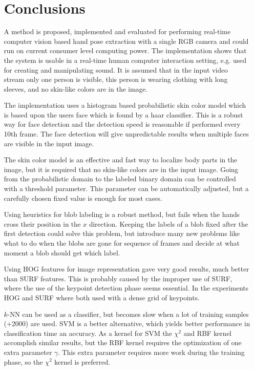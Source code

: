
\chapter{Conclusions}
\label{ch:conc}
A method is proposed, implemented and evaluated for performing real-time computer vision based hand pose extraction with a single RGB camera and could run on current consumer level computing power. The implementation shows that the system is usable in a real-time human computer interaction setting, e.g. used for creating and manipulating sound. It is assumed that in the input video stream only one person is visible, this person is wearing clothing with long sleeves, and no skin-like colors are in the image.

The implementation uses a histogram based probabilistic skin color model which is based upon the users face which is found by a haar classifier. This is a robust way for face detection and the detection speed is reasonable if performed every 10th frame. The face detection will give unpredictable results when multiple faces are visible in the input image.

The skin color model is an effective and fast way to localize body parts in the image, but it is required that no skin-like colors are in the input image. Going from the probabilistic domain to the labeled binary domain can be controlled with a threshold parameter.  This parameter can be automatically adjusted, but a carefully chosen fixed value is enough for most cases. 

Using heuristics for blob labeling is a robust method, but fails when the hands cross their position in the $x$ direction. Keeping the labels of a blob fixed after the first detection could solve this problem, but introduce many new problems like what to do when the blobs are gone for sequence of frames and decide at what moment a blob should get which label.

Using HOG features for image representation gave very good results, much better than SURF features. This is probably caused by the improper use of SURF, where the use of the keypoint detection phase seems essential. In the experiments HOG and SURF where both used with a dense grid of keypoints.

$k$-NN can be used as a classifier, but becomes slow when a lot of training samples (+2000) are used. SVM is a better alternative, which yields better performance in classification time an accuracy. As a kernel for SVM the $\chi^2$ and RBF kernel accomplish similar results, but the RBF kernel requires the optimization of one extra parameter $\gamma$. This extra parameter requires more work during the training phase, so the $\chi^2$ kernel is preferred.

